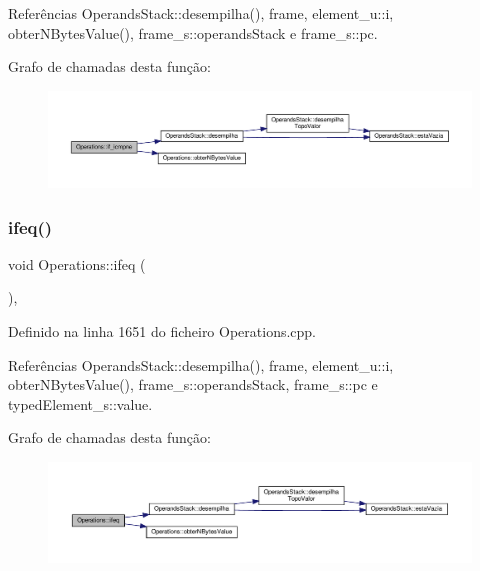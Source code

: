 Referências Operands\+Stack\+::desempilha(), frame, element\+\_\+u\+::i, obter\+N\+Bytes\+Value(), frame\+\_\+s\+::operands\+Stack e frame\+\_\+s\+::pc.

Grafo de chamadas desta função\+:
\nopagebreak
\begin{figure}[H]
\begin{center}
\leavevmode
\includegraphics[width=350pt]{classOperations_a52dca630766e37bbaf0e7439c0335273_cgraph}
\end{center}
\end{figure}
\mbox{\label{classOperations_ad33c8bdb5f67bdbf0885bb51990f99ee}} 
\subsubsection{\texorpdfstring{ifeq()}{ifeq()}}
{\footnotesize\ttfamily void Operations\+::ifeq (\begin{DoxyParamCaption}{ }\end{DoxyParamCaption})\hspace{0.3cm}{\ttfamily [static]}, {\ttfamily [private]}}



Definido na linha 1651 do ficheiro Operations.\+cpp.



Referências Operands\+Stack\+::desempilha(), frame, element\+\_\+u\+::i, obter\+N\+Bytes\+Value(), frame\+\_\+s\+::operands\+Stack, frame\+\_\+s\+::pc e typed\+Element\+\_\+s\+::value.

Grafo de chamadas desta função\+:
\nopagebreak
\begin{figure}[H]
\begin{center}
\leavevmode
\includegraphics[width=350pt]{classOperations_ad33c8bdb5f67bdbf0885bb51990f99ee_cgraph}
\end{center}
\end{figure}
\mbox{\label{classOperations_a0e7cf2111ad25ee52aa329cc6ec4d38a}} 
